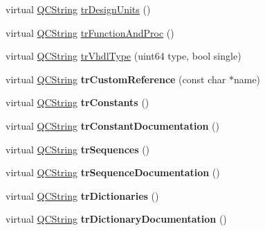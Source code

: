 \begin{DoxyCompactItemize}
\item 
virtual \mbox{\hyperlink{class_q_c_string}{Q\+C\+String}} \mbox{\hyperlink{class_translator_french_a7fa9edf7b2c8c0a18552b5a15dd1f781}{tr\+Design\+Units}} ()
\item 
virtual \mbox{\hyperlink{class_q_c_string}{Q\+C\+String}} \mbox{\hyperlink{class_translator_french_a97e2e1c5e8f8052a346386a6538ca709}{tr\+Function\+And\+Proc}} ()
\item 
virtual \mbox{\hyperlink{class_q_c_string}{Q\+C\+String}} \mbox{\hyperlink{class_translator_french_a2a5ccf040fb215dad80e277ba35d2ce6}{tr\+Vhdl\+Type}} (uint64 type, bool single)
\item 
\mbox{\label{class_translator_french_aeb4b24bb83bbd1124b74b59a5e7a6226}} 
virtual \mbox{\hyperlink{class_q_c_string}{Q\+C\+String}} {\bfseries tr\+Custom\+Reference} (const char $\ast$name)
\item 
\mbox{\label{class_translator_french_a460993aae266a9e2bd4e2c090e71eb41}} 
virtual \mbox{\hyperlink{class_q_c_string}{Q\+C\+String}} {\bfseries tr\+Constants} ()
\item 
\mbox{\label{class_translator_french_a8dbb914cc7d9f778f07b7005a9875c1f}} 
virtual \mbox{\hyperlink{class_q_c_string}{Q\+C\+String}} {\bfseries tr\+Constant\+Documentation} ()
\item 
\mbox{\label{class_translator_french_a2787255f22f2f542fc3059180e846136}} 
virtual \mbox{\hyperlink{class_q_c_string}{Q\+C\+String}} {\bfseries tr\+Sequences} ()
\item 
\mbox{\label{class_translator_french_a9599c77169c1f91a11b1c7c83717fdff}} 
virtual \mbox{\hyperlink{class_q_c_string}{Q\+C\+String}} {\bfseries tr\+Sequence\+Documentation} ()
\item 
\mbox{\label{class_translator_french_a11ee2d32e4d0b861387b324300cafc91}} 
virtual \mbox{\hyperlink{class_q_c_string}{Q\+C\+String}} {\bfseries tr\+Dictionaries} ()
\item 
\mbox{\label{class_translator_french_a11f7504ce7e752d3f3cc2b4fbd1dc66a}} 
virtual \mbox{\hyperlink{class_q_c_string}{Q\+C\+String}} {\bfseries tr\+Dictionary\+Documentation} ()

\end{DoxyCompactItemize}
